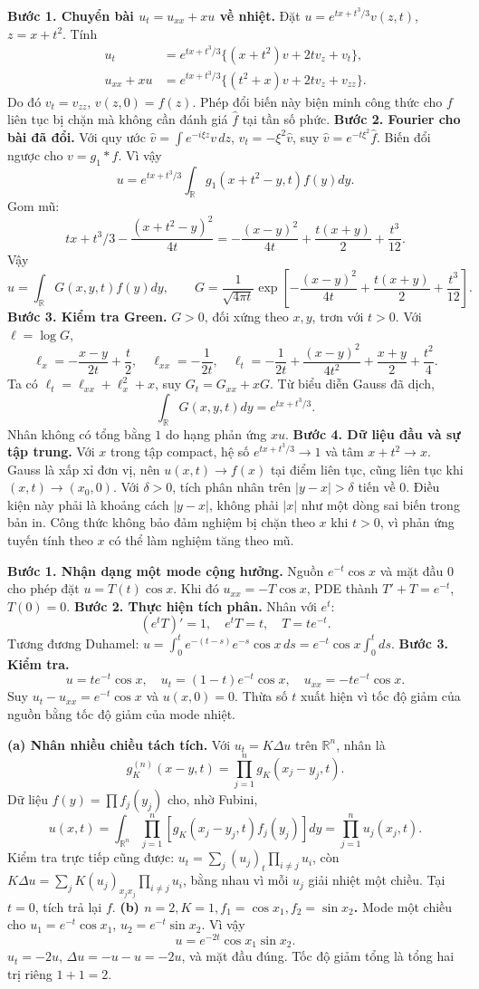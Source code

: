 \textbf{Bước 1. Chuyển bài $u_t=u_{xx}+xu$ về nhiệt.}
Đặt $u=e^{tx+t^3/3}v(z,t)$, $z=x+t^2$. Tính
\begin{align*}
u_t&=e^{tx+t^3/3}\{(x+t^2)v+2tv_z+v_t\},\\
u_{xx}+xu&=e^{tx+t^3/3}\{(t^2+x)v+2tv_z+v_{zz}\}.
\end{align*}
Do đó $v_t=v_{zz}$, $v(z,0)=f(z)$. Phép đổi biến này biện minh công thức cho $f$ liên tục bị chặn mà không cần đánh giá $\widehat f$ tại tần số phức.
\textbf{Bước 2. Fourier cho bài đã đổi.} Với quy ước $\widehat v=\int e^{-i\xi z}v\,dz$, $\widehat v_t=-\xi^2\widehat v$, suy $\widehat v=e^{-t\xi^2}\widehat f$. Biến đổi ngược cho $v=g_1*f$. Vì vậy
\[u=e^{tx+t^3/3}\int_{\mathbb R}g_1(x+t^2-y,t)f(y)dy.\]
Gom mũ:
\[tx+t^3/3-\frac{(x+t^2-y)^2}{4t}
=-\frac{(x-y)^2}{4t}+\frac{t(x+y)}2+\frac{t^3}{12}.\]
Vậy
\[u=\int_{\mathbb R}G(x,y,t)f(y)dy,\qquad
G=\frac1{\sqrt{4\pi t}}
\exp\left[-\frac{(x-y)^2}{4t}+\frac{t(x+y)}2+\frac{t^3}{12}\right].\]
\textbf{Bước 3. Kiểm tra Green.} $G>0$, đối xứng theo $x,y$, trơn với $t>0$. Với $\ell=\log G$,
\[\ell_x=-\frac{x-y}{2t}+\frac t2,\quad \ell_{xx}=-\frac1{2t},\quad
\ell_t=-\frac1{2t}+\frac{(x-y)^2}{4t^2}+\frac{x+y}2+\frac{t^2}4.\]
Ta có $\ell_t=\ell_{xx}+\ell_x^2+x$, suy $G_t=G_{xx}+xG$. Từ biểu diễn Gauss đã dịch,
\[\int_{\mathbb R}G(x,y,t)dy=e^{tx+t^3/3}.\]
Nhân không có tổng bằng $1$ do hạng phản ứng $xu$.
\textbf{Bước 4. Dữ liệu đầu và sự tập trung.} Với $x$ trong tập compact, hệ số $e^{tx+t^3/3}\to1$ và tâm $x+t^2\to x$. Gauss là xấp xỉ đơn vị, nên $u(x,t)\to f(x)$ tại điểm liên tục, cũng liên tục khi $(x,t)\to(x_0,0)$. Với $\delta>0$, tích phân nhân trên $|y-x|>\delta$ tiến về $0$. Điều kiện này phải là khoảng cách $|y-x|$, không phải $|x|$ như một dòng sai biến trong bản in. Công thức không bảo đảm nghiệm bị chặn theo $x$ khi $t>0$, vì phản ứng tuyến tính theo $x$ có thể làm nghiệm tăng theo mũ.

\textbf{Bước 1. Nhận dạng một mode cộng hưởng.}
Nguồn $e^{-t}\cos x$ và mặt đầu $0$ cho phép đặt $u=T(t)\cos x$. Khi đó $u_{xx}=-T\cos x$, PDE thành $T'+T=e^{-t}$, $T(0)=0$.
\textbf{Bước 2. Thực hiện tích phân.} Nhân với $e^t$:
\[(e^tT)'=1,\quad e^tT=t,\quad T=te^{-t}.\]
Tương đương Duhamel: $u=\int_0^te^{-(t-s)}e^{-s}\cos x\,ds=e^{-t}\cos x\int_0^tds$.
\textbf{Bước 3. Kiểm tra.}
\[u=te^{-t}\cos x,\quad u_t=(1-t)e^{-t}\cos x,\quad
u_{xx}=-te^{-t}\cos x.\]
Suy $u_t-u_{xx}=e^{-t}\cos x$ và $u(x,0)=0$. Thừa số $t$ xuất hiện vì tốc độ giảm của nguồn bằng tốc độ giảm của mode nhiệt.

\textbf{(a) Nhân nhiều chiều tách tích.}
Với $u_t=K\Delta u$ trên $\mathbb R^n$, nhân là
\[g_K^{(n)}(x-y,t)=\prod_{j=1}^n g_K(x_j-y_j,t).\]
Dữ liệu $f(y)=\prod f_j(y_j)$ cho, nhờ Fubini,
\[u(x,t)=\int_{\mathbb R^n}\prod_{j=1}^n[g_K(x_j-y_j,t)f_j(y_j)]dy
=\prod_{j=1}^nu_j(x_j,t).\]
Kiểm tra trực tiếp cũng được: $u_t=\sum_j(u_j)_t\prod_{i\ne j}u_i$, còn $K\Delta u=\sum_jK(u_j)_{x_jx_j}\prod_{i\ne j}u_i$, bằng nhau vì mỗi $u_j$ giải nhiệt một chiều. Tại $t=0$, tích trả lại $f$.
\textbf{(b) $n=2,K=1,f_1=\cos x_1,f_2=\sin x_2$.}
Mode một chiều cho $u_1=e^{-t}\cos x_1$, $u_2=e^{-t}\sin x_2$. Vì vậy
\[u=e^{-2t}\cos x_1\sin x_2.\]
$u_t=-2u$, $\Delta u=-u-u=-2u$, và mặt đầu đúng. Tốc độ giảm tổng là tổng hai trị riêng $1+1=2$.

